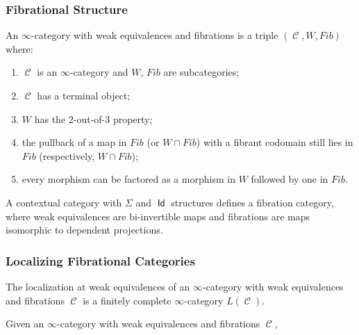 \documentclass{beamer}
\DeclareMathOperator{\Id}{\mathsf{Id}}
\DeclareMathOperator{\cC}{\mathcal{C}}
\begin{document}
\begin{frame}
  \frametitle{Fibrational Structure}
  
  \begin{defn}
    An $\infty$-category with weak equivalences and fibrations is a triple
    $(\cC,W,Fib)$ where:
    \begin{enumerate}
      \item $\cC$ is an $\infty$-category and $W$, $Fib$ are subcategories;
      \item $\cC$ has a terminal object;
      \item $W$ has the 2-out-of-3 property;
      \item the pullback of a map in $Fib$ (or $W\cap Fib$) with a fibrant
        codomain still lies in $Fib$ (respectively, $W\cap Fib$);
      \item every morphism can be factored as a morphism in $W$ followed by one
        in $Fib$.
    \end{enumerate}
  \end{defn}

  \begin{thm}
    A contextual category with $\Sigma$ and $\Id$ structures defines a
    fibration category, where weak
    equivalences are bi-invertible maps and
    fibrations are maps isomorphic to  dependent projections.
  \end{thm}
\end{frame}

\begin{frame}
  \frametitle{Localizing Fibrational Categories}

  \begin{thm}
    The localization at weak equivalences of an $\infty$-category with weak
    equivalences and fibrations $\cC$ is a finitely complete $\infty$-category
    $L(\cC)$.
  \end{thm}

  \begin{thm}
    Given an $\infty$-category with weak equivalences and fibrations $\cC$,
  \end{thm}
\end{frame}
\end{document}
